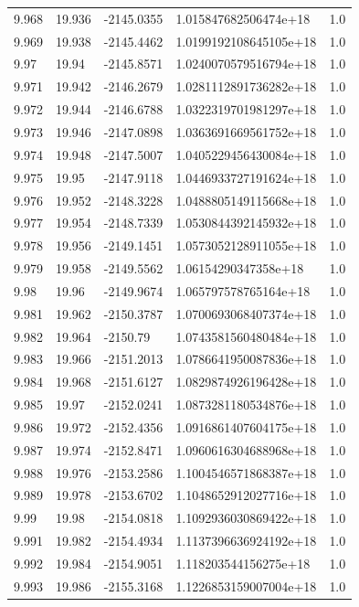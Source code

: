 \begin{tabular}{lllll}
9.968 & 19.936 & -2145.0355 & 1.015847682506474e+18 & 1.0 \\
9.969 & 19.938 & -2145.4462 & 1.0199192108645105e+18 & 1.0 \\
9.97 & 19.94 & -2145.8571 & 1.0240070579516794e+18 & 1.0 \\
9.971 & 19.942 & -2146.2679 & 1.0281112891736282e+18 & 1.0 \\
9.972 & 19.944 & -2146.6788 & 1.0322319701981297e+18 & 1.0 \\
9.973 & 19.946 & -2147.0898 & 1.0363691669561752e+18 & 1.0 \\
9.974 & 19.948 & -2147.5007 & 1.0405229456430084e+18 & 1.0 \\
9.975 & 19.95 & -2147.9118 & 1.0446933727191624e+18 & 1.0 \\
9.976 & 19.952 & -2148.3228 & 1.0488805149115668e+18 & 1.0 \\
9.977 & 19.954 & -2148.7339 & 1.0530844392145932e+18 & 1.0 \\
9.978 & 19.956 & -2149.1451 & 1.0573052128911055e+18 & 1.0 \\
9.979 & 19.958 & -2149.5562 & 1.06154290347358e+18 & 1.0 \\
9.98 & 19.96 & -2149.9674 & 1.065797578765164e+18 & 1.0 \\
9.981 & 19.962 & -2150.3787 & 1.0700693068407374e+18 & 1.0 \\
9.982 & 19.964 & -2150.79 & 1.0743581560480484e+18 & 1.0 \\
9.983 & 19.966 & -2151.2013 & 1.0786641950087836e+18 & 1.0 \\
9.984 & 19.968 & -2151.6127 & 1.0829874926196428e+18 & 1.0 \\
9.985 & 19.97 & -2152.0241 & 1.0873281180534876e+18 & 1.0 \\
9.986 & 19.972 & -2152.4356 & 1.0916861407604175e+18 & 1.0 \\
9.987 & 19.974 & -2152.8471 & 1.0960616304688968e+18 & 1.0 \\
9.988 & 19.976 & -2153.2586 & 1.1004546571868387e+18 & 1.0 \\
9.989 & 19.978 & -2153.6702 & 1.1048652912027716e+18 & 1.0 \\
9.99 & 19.98 & -2154.0818 & 1.1092936030869422e+18 & 1.0 \\
9.991 & 19.982 & -2154.4934 & 1.1137396636924192e+18 & 1.0 \\
9.992 & 19.984 & -2154.9051 & 1.118203544156275e+18 & 1.0 \\
9.993 & 19.986 & -2155.3168 & 1.1226853159007004e+18 & 1.0 \\

\end{tabular}
